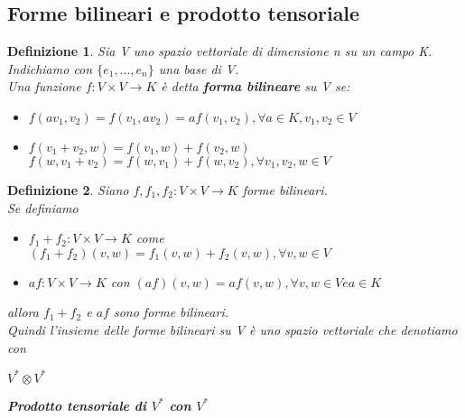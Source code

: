 \documentclass[a4paper,12pt]{article}
\theoremstyle{def}
\newtheorem*{definition}{Definizione}
\theoremstyle{prop}
\theoremstyle{esempio}
\theoremstyle{dimostrazione}
\theoremstyle{teo}
\theoremstyle{osservazione}
\begin{document}
\newpage

\subsection{Forme bilineari e prodotto tensoriale}
\begin{definition}
	Sia V uno spazio vettoriale  di dimensione n su un campo K.\\
	Indichiamo con \(\{e_1, ... , e_n\}\) una base di V.\\
	Una funzione \(f : V \times V \rightarrow K\) è detta \textbf{forma bilineare} su V se:
	\begin{itemize}
		\item \(f(a v_1, v_2) = f(v_1, a v_2) = a f(v_1,v_2), \forall a \in K, v_1, v_2 \in V\)
		\item \(f(v_1 + v_2, w) = f(v_1, w) + f(v_2, w)\)\\
		      \(f(w, v_1 + v_2) = f(w, v_1) + f(w, v_2), \forall v_1, v_2, w \in V\)
	\end{itemize}
\end{definition}

\begin{definition}
	Siano \(f, f_1, f_2 : V \times V \rightarrow K\) forme bilineari.\\
	Se definiamo
	\begin{itemize}
		\item \(f_1 + f_2 : V \times V \rightarrow K\) come \((f_1 + f_2)(v, w) = f_1(v, w) + f_2(v, w), \forall v,w \in V\)
		\item\(a f : V \times V \rightarrow K\) con \((a f)(v, w) = a f(v, w), \forall v,w \in V e a \in K\)
	\end{itemize}
	allora \(f_1 + f_2\) e \(a f\) sono forme bilineari.\\
	Quindi l'insieme delle forme bilineari su V è uno spazio vettoriale che denotiamo con
	\begin{center}
		\(V^* \otimes V^*\)
	\end{center}
	\textbf{Prodotto tensoriale di \(V^*\) con \(V^*\)}
\end{definition}
\end{document}

